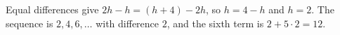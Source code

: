 Equal differences give $2h-h=(h+4)-2h$, so $h=4-h$ and $h=2$. The sequence is $2,4,6,\dots$ with difference $2$, and the sixth term is $2+5\cdot2=\boxed{12}$.
